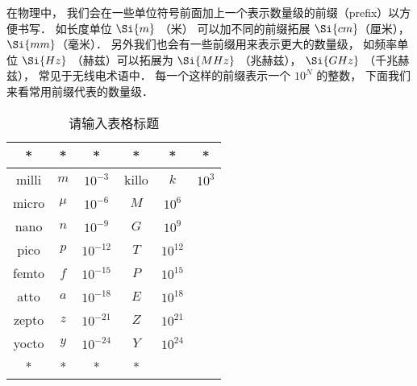 
在物理中， 我们会在一些单位符号前面加上一个表示数量级的前缀（prefix）以方便书写． 如长度单位 $\Si{m}$ （米） 可以加不同的前缀拓展 $\Si{cm}$（厘米）， $\Si{mm}$（毫米）． 另外我们也会有一些前缀用来表示更大的数量级， 如频率单位 $\Si{Hz}$ （赫兹）可以拓展为 $\Si{MHz}$ （兆赫兹）， $\Si{GHz}$ （千兆赫兹）， 常见于无线电术语中． 每一个这样的前缀表示一个 $10^N$ 的整数， 下面我们来看常用前缀代表的数量级．

\begin{table}[ht]
\centering
\caption{请输入表格标题}\label{UniPre_tab1}
\begin{tabular}{|c|c|c|c|c|c|}
\hline
* & * & * & * & * & * \\
\hline
milli & $m$ & $10^{-3}$ & killo & $k$ & $10^3$ \\
\hline
micro & $\mu$ & $10^{-6}$ & $M$ & $10^6$ \\
\hline
nano & $n$ & $10^{-9}$ & $G$ & $10^9$ \\
\hline
pico & $p$ & $10^{-12}$ & $T$ & $10^{12}$ \\
\hline
femto & $f$ & $10^{-15}$ & $P$ & $10^{15}$ \\
\hline
atto & $a$ & $10^{-18}$ & $E$ & $10^{18}$ \\
\hline
zepto & $z$ & $10^{-21}$ & $Z$ & $10^{21}$ \\
\hline
yocto & $y$ & $10^{-24}$ & $Y$ & $10^{24}$ \\
\hline
* & * & * & * \\
\hline
\end{tabular}
\end{table}
